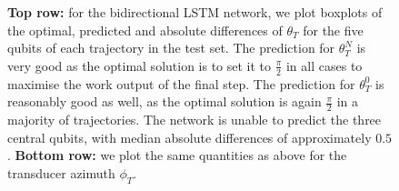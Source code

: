 \begin{figure}
\begin{subfigure}{0.32\textwidth}
\end{subfigure}
\caption{\textbf{Top row:} for the bidirectional LSTM network, we plot boxplots of the optimal, predicted and absolute differences of $\theta_T$ for the five qubits of each trajectory in the test set. The prediction for $\theta_T^N$ is very good as the optimal solution is to set it to $\frac{\pi}{2}$ in all cases to maximise the work output of the final step. The prediction for $\theta_T^0$ is reasonably good as well, as the optimal solution is again $\frac{\pi}{2}$ in a majority of trajectories. The network is unable to predict the three central qubits, with median absolute differences of approximately $0.5$. \textbf{Bottom row:} we plot the same quantities as above for the transducer azimuth $\phi_T$.}
\label{bilstmbox}
\end{figure}
